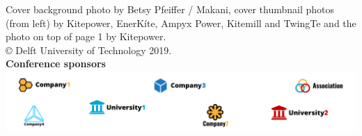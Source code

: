 Cover background photo by Betsy Pfeiffer / Makani, cover thumbnail photos  (from left) by Kitepower, EnerKíte, Ampyx Power, Kitemill and TwingTe and the photo on top of page 1 by Kitepower.\\[3pt]

© Delft University of Technology 2019.\\[6pt]

\textbf{\Large Conference sponsors}\\

\includegraphics[width=\textwidth]{figures/sponsorlogos.pdf}
